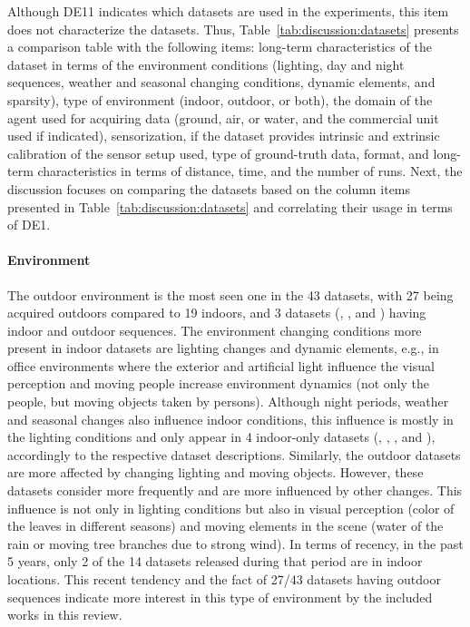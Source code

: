 Although DE11 indicates which datasets are used in the experiments, this item does not characterize the datasets. Thus, Table~\ref{tab:discussion:datasets} presents a comparison table with the following items: long-term characteristics of the dataset in terms of the environment conditions (lighting, day and night sequences, weather and seasonal changing conditions, dynamic elements, and sparsity), type of environment (indoor, outdoor, or both), the domain of the agent used for acquiring data (ground, air, or water, and the commercial unit used if indicated), sensorization, if the dataset provides intrinsic and extrinsic calibration of the sensor setup used, type of ground-truth data, format, and long-term characteristics in terms of distance, time, and the number of runs. Next, the discussion focuses on comparing the datasets based on the column items presented in Table~\ref{tab:discussion:datasets} and correlating their usage in terms of DE1.




\paragraph{Environment}

The outdoor environment is the most seen one in the 43 datasets, with 27 being acquired outdoors compared to 19 indoors, and 3 datasets (, , and ) having indoor and outdoor sequences.
The environment changing conditions more present in indoor datasets are lighting changes and dynamic elements, e.g., in office environments where the exterior and artificial light influence the visual perception and moving people increase environment dynamics (not only the people, but moving objects taken by persons).
Although night periods, weather and seasonal changes also influence indoor conditions, this influence is mostly in the lighting conditions and only appear in 4 indoor-only datasets (, , , and ), accordingly to the respective dataset descriptions.
Similarly, the outdoor datasets are more affected by changing lighting and moving objects. However, these datasets consider more frequently and are more influenced by other changes. This influence is not only in lighting conditions but also in visual perception (color of the leaves in different seasons) and moving elements in the scene (water of the rain or moving tree branches due to strong wind).
In terms of recency, in the past 5 years, only 2 of the 14 datasets released during that period are in indoor locations. This recent tendency and the fact of 27/43 datasets having outdoor sequences indicate more interest in this type of environment by the included works in this review.

